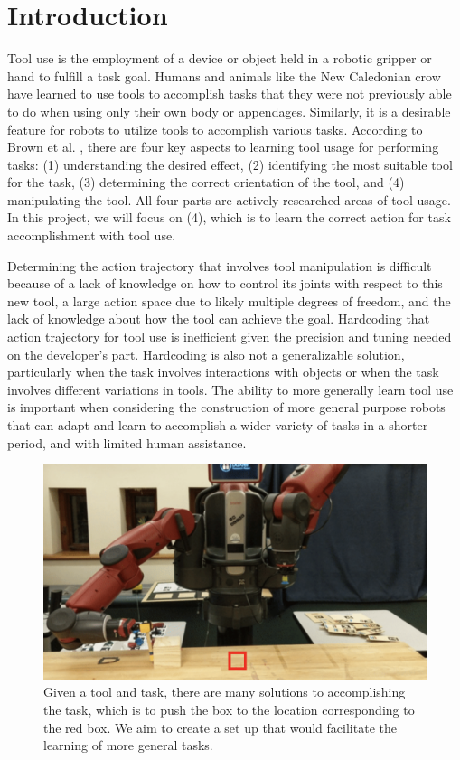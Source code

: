\documentclass[conference]{IEEEtran}
\begin{document}
\section{Introduction}
Tool use is the employment of a device or object held in a robotic gripper or hand to fulfill a task goal. Humans and animals like the New Caledonian crow have learned to use tools to accomplish tasks that they were not previously able to do when using only their own body or appendages. Similarly, it is a desirable feature for robots to utilize tools to accomplish various tasks. According to Brown et al. \cite{b1}, there are four key aspects to learning tool usage for performing tasks: (1) understanding the desired effect, (2) identifying the most suitable tool for the task, (3) determining the correct orientation of the tool, and (4) manipulating the tool. All four parts are actively researched areas of tool usage. In this project, we will focus on (4), which is to learn the correct action for task accomplishment with tool use.

Determining the action trajectory that involves tool manipulation is difficult because of a lack of knowledge on how to control its joints with respect to this new tool, a large action space due to likely multiple degrees of freedom, and the lack of knowledge about how the tool can achieve the goal. Hardcoding that action trajectory for tool use is inefficient given the precision and tuning needed on the developer's part. Hardcoding is also not a generalizable solution, particularly when the task involves interactions with objects or when the task involves different variations in tools. The ability to more generally learn tool use is important when considering the construction of more general purpose robots that can adapt and learn to accomplish a wider variety of tasks in a shorter period, and with limited human assistance.

\begin{figure}[h!]
\centering
 \includegraphics[scale=0.45]{baxter_goal.png}
 \caption{Given a tool and task, there are many solutions to accomplishing the task, which is to push the box to the location corresponding to the red box. We aim to create a set up that would facilitate the learning of more general tasks.}
\end{figure} 
\end{document}
